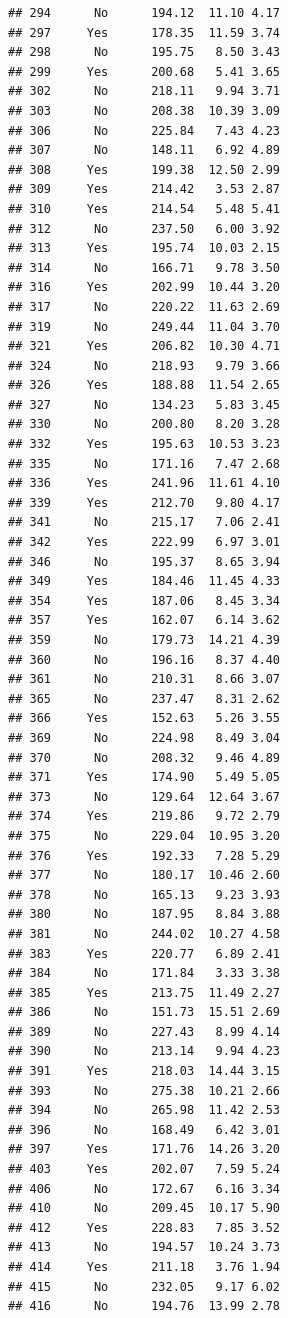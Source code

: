 \documentclass[
]{article}
\begin{document}
\begin{verbatim}
## 294      No      194.12  11.10 4.17
## 297     Yes      178.35  11.59 3.74
## 298      No      195.75   8.50 3.43
## 299     Yes      200.68   5.41 3.65
## 302      No      218.11   9.94 3.71
## 303      No      208.38  10.39 3.09
## 306      No      225.84   7.43 4.23
## 307      No      148.11   6.92 4.89
## 308     Yes      199.38  12.50 2.99
## 309     Yes      214.42   3.53 2.87
## 310     Yes      214.54   5.48 5.41
## 312      No      237.50   6.00 3.92
## 313     Yes      195.74  10.03 2.15
## 314      No      166.71   9.78 3.50
## 316     Yes      202.99  10.44 3.20
## 317      No      220.22  11.63 2.69
## 319      No      249.44  11.04 3.70
## 321     Yes      206.82  10.30 4.71
## 324      No      218.93   9.79 3.66
## 326     Yes      188.88  11.54 2.65
## 327      No      134.23   5.83 3.45
## 330      No      200.80   8.20 3.28
## 332     Yes      195.63  10.53 3.23
## 335      No      171.16   7.47 2.68
## 336     Yes      241.96  11.61 4.10
## 339     Yes      212.70   9.80 4.17
## 341      No      215.17   7.06 2.41
## 342     Yes      222.99   6.97 3.01
## 346      No      195.37   8.65 3.94
## 349     Yes      184.46  11.45 4.33
## 354     Yes      187.06   8.45 3.34
## 357     Yes      162.07   6.14 3.62
## 359      No      179.73  14.21 4.39
## 360      No      196.16   8.37 4.40
## 361      No      210.31   8.66 3.07
## 365      No      237.47   8.31 2.62
## 366     Yes      152.63   5.26 3.55
## 369      No      224.98   8.49 3.04
## 370      No      208.32   9.46 4.89
## 371     Yes      174.90   5.49 5.05
## 373      No      129.64  12.64 3.67
## 374     Yes      219.86   9.72 2.79
## 375      No      229.04  10.95 3.20
## 376     Yes      192.33   7.28 5.29
## 377      No      180.17  10.46 2.60
## 378      No      165.13   9.23 3.93
## 380      No      187.95   8.84 3.88
## 381      No      244.02  10.27 4.58
## 383     Yes      220.77   6.89 2.41
## 384      No      171.84   3.33 3.38
## 385     Yes      213.75  11.49 2.27
## 386      No      151.73  15.51 2.69
## 389      No      227.43   8.99 4.14
## 390      No      213.14   9.94 4.23
## 391     Yes      218.03  14.44 3.15
## 393      No      275.38  10.21 2.66
## 394      No      265.98  11.42 2.53
## 396      No      168.49   6.42 3.01
## 397     Yes      171.76  14.26 3.20
## 403     Yes      202.07   7.59 5.24
## 406      No      172.67   6.16 3.34
## 410      No      209.45  10.17 5.90
## 412     Yes      228.83   7.85 3.52
## 413      No      194.57  10.24 3.73
## 414     Yes      211.18   3.76 1.94
## 415      No      232.05   9.17 6.02
## 416      No      194.76  13.99 2.78

\end{verbatim}
\end{document}

